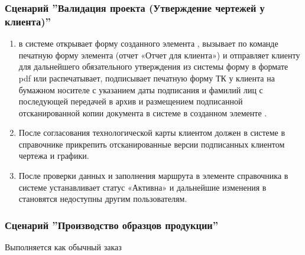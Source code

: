 \subsubsection{Сценарий ''Валидация проекта (Утверждение чертежей у клиента)''}
\label{bp:pm_2}

\begin{enumerate}

\item \manager  в системе  \gofro открывает форму созданного элемента , вызывает по команде  печатную форму элемента  (отчет «Отчет для клиента») и отправляет клиенту для дальнейшего обязательного утверждения из системы \gofro форму в формате pdf или распечатывает, подписывает печатную форму ТК у клиента на бумажном носителе с указанием даты подписания и фамилий лиц с последующей передачей в архив и размещением подписанной отсканированной копии документа в системе \gofro в созданном элементе .
\item	После согласования технологической карты клиентом \manager должен в системе \gofro в справочнике  прикрепить отсканированные версии подписанных клиентом чертежа и графики.
\item	После проверки данных и заполнения маршрута \tehnolog  
в элементе справочника
 в системе \gofro устанавливает статус «Активна» и дальнейшие изменения в  становятся недоступны другим пользователям.

\end{enumerate}




\subsubsection{Сценарий ''Производство образцов продукции''}
Выполняется как обычный заказ

\label{bp:pm_3}

